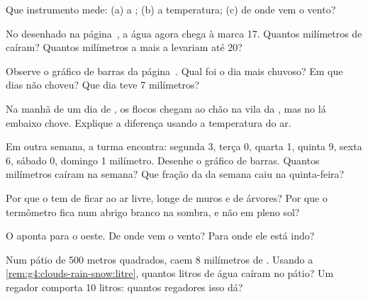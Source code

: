 \begin{exercise}[$\star$]\label{exo:g4:clouds-rain-snow:4}
Que instrumento mede: (a) a ; (b) a temperatura; (c) de onde vem o
vento?
\end{exercise}

\begin{exercise}[$\star$]\label{exo:g4:clouds-rain-snow:5}
No  desenhado na página~\pageref{fig:g4:clouds-rain-snow:gauge}, a água
agora chega à marca 17. Quantos milímetros de  caíram? Quantos
milímetros a mais a levariam até 20?
\end{exercise}

\begin{exercise}[$\star$]\label{exo:g4:clouds-rain-snow:6}
Observe o gráfico de barras da página~\pageref{fig:g4:clouds-rain-snow:bars}. Qual
foi o dia mais chuvoso? Em que dias não choveu? Que dia teve 7
milímetros?
\end{exercise}

\begin{exercise}[$\star\star$]\label{exo:g4:clouds-rain-snow:7}
Na manhã de um dia de , os flocos chegam ao chão na vila da ,
mas no  lá embaixo chove. Explique a diferença usando a temperatura
do ar.
\end{exercise}

\begin{exercise}[$\star\star$]\label{exo:g4:clouds-rain-snow:8}
Em outra semana, a turma encontra: segunda 3, terça 0, quarta 1, quinta 9,
sexta 6, sábado 0, domingo 1 milímetro. Desenhe o gráfico de barras.
Quantos milímetros caíram na semana? Que fração da  da semana caiu
na quinta-feira?
\end{exercise}

\begin{exercise}[$\star\star$]\label{exo:g4:clouds-rain-snow:9}
Por que o  tem de ficar ao ar livre, longe de muros e de
árvores? Por que o termômetro fica num abrigo branco na sombra, e não em
pleno sol?
\end{exercise}

\begin{exercise}[$\star\star$]\label{exo:g4:clouds-rain-snow:10}
O  aponta para o oeste. De onde vem o vento? Para onde ele está
indo?
\end{exercise}

\begin{exercise}[$\star\star\star$]\label{exo:g4:clouds-rain-snow:11}
Num pátio de 500 metros quadrados, caem 8 milímetros de . Usando a
\cref{rem:g4:clouds-rain-snow:litre}, quantos litros de água caíram no
pátio? Um regador comporta 10 litros: quantos regadores isso dá?
\end{exercise}
